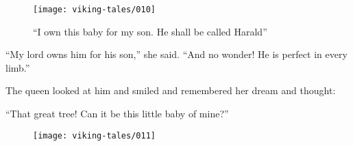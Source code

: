 \begin{figure}[ht]
    \centering
    \texttt{[image: viking-tales/010]}
    \caption{``I own this baby for my son. He shall be called Harald''}
\end{figure}

``My lord owns him for his son,'' she said. ``And no wonder! He is
perfect in every limb.''

The queen looked at him and smiled and remembered her dream and thought:

``That great tree! Can it be this little baby of mine?''

\begin{figure}[hb]
    \centering
    \vskip8pt
    \texttt{[image: viking-tales/011]}
\end{figure}
